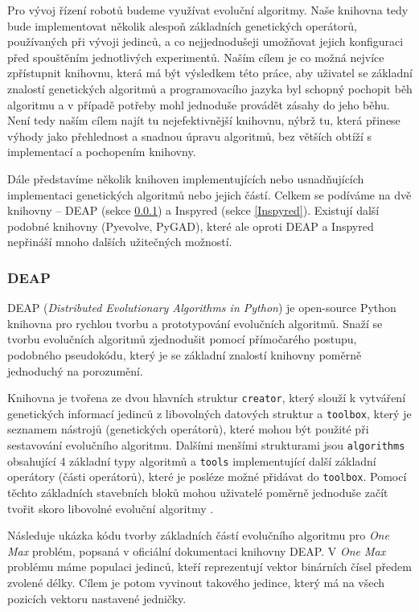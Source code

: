 Pro vývoj řízení robotů budeme využívat evoluční algoritmy. Naše knihovna tedy
bude implementovat několik alespoň základních genetických operátorů,
používaných při vývoji jedinců, a co nejjednodušeji umožňovat jejich
konfiguraci před spouštěním jednotlivých experimentů. Naším cílem je co možná
nejvíce zpřístupnit knihovnu, která má být výsledkem této práce, aby uživatel
se základní znalostí genetických algoritmů a programovacího jazyka byl schopný
pochopit běh algoritmu a v případě potřeby mohl jednoduše provádět zásahy do
jeho běhu. Není tedy naším cílem najít tu nejefektivnější knihovnu, nýbrž tu,
která přinese výhody jako přehlednost a snadnou úpravu algoritmů, bez větších
obtíží s implementací a pochopením knihovny.

Dále představíme několik knihoven implementujících nebo usnadňujících
implementaci genetických algoritmů nebo jejich částí. Celkem se podíváme na dvě
knihovny -- DEAP (sekce \ref{DEAP}) a Inspyred (sekce \ref{Inspyred}).
Existují další podobné knihovny (Pyevolve, PyGAD), které ale oproti DEAP a
Inspyred nepřináší mnoho dalších užitečných možností.

\subsubsection{DEAP} \label{DEAP}

DEAP (\emph{Distributed Evolutionary Algorithms in Python}) \citep{deapproject}
je open-source Python knihovna pro rychlou tvorbu a prototypování evolučních
algoritmů. Snaží se tvorbu evolučních algoritmů zjednodušit pomocí přímočarého
postupu, podobného pseudokódu, který je se základní znalostí knihovny poměrně
jednoduchý na porozumění. 

Knihovna je tvořena ze dvou hlavních struktur \texttt{creator}, který slouží k
vytváření genetických informací jedinců z libovolných datových struktur a
\texttt{toolbox}, který je seznamem nástrojů (genetických operátorů), které
mohou být použité při sestavování evolučního algoritmu. Dalšími menšími
strukturami jsou \texttt{algorithms} obsahující 4 základní typy algoritmů a
\texttt{tools} implementující další základní operátory (části operátorů), které
je posléze možné přidávat do \texttt{toolbox}. Pomocí těchto základních
stavebních bloků mohou uživatelé poměrně jednoduše začít tvořit skoro libovolné
evoluční algoritmy \citep{fortin2012deap}. 

Následuje ukázka kódu tvorby základních částí evolučního algoritmu pro
\emph{One Max} problém, popsaná v oficiální dokumentaci knihovny DEAP. V
\emph{One Max} problému máme populaci jedinců, kteří reprezentují vektor
binárních čísel předem zvolené délky. Cílem je potom vyvinout takového jedince,
který má na všech pozicích vektoru nastavené jedničky. 

